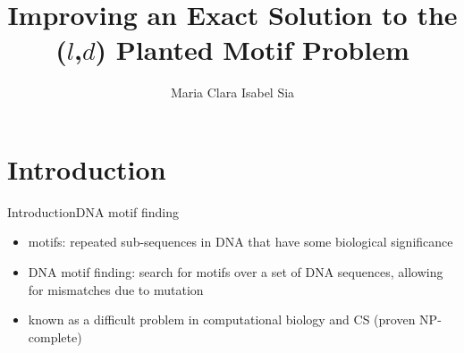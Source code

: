 \documentclass[pdf,xcolor={dvipsnames}]{beamer}
\title{Improving an Exact Solution to the \newline ($l$,$d$) Planted Motif Problem}
\author{Maria Clara Isabel Sia}
\begin{document}
\begin{frame}
\titlepage
\end{frame}

\section{Introduction}
	\begin{frame}{Introduction}{DNA motif finding}
		\begin{itemize}
			\item motifs: repeated sub-sequences in DNA that have some biological significance\newline
			\item DNA motif finding: search for motifs over a set of DNA sequences, allowing for mismatches due to mutation\newline
			\item known as a difficult problem in computational biology and CS (proven NP-complete)\newline
		\end{itemize}
		\end{frame}
\end{document}
